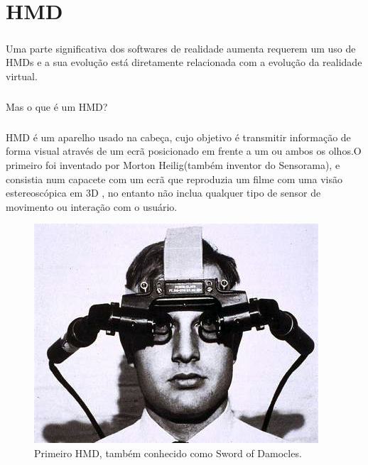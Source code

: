 \chapter{HMD}
		\paragraph{} 
Uma parte significativa dos softwares de realidade aumenta requerem um uso de HMDs e a sua evolução está diretamente relacionada com a evolução da realidade virtual.\paragraph{}
 Mas o que é um HMD? \paragraph*{}
 HMD é um aparelho usado na cabeça, cujo objetivo é transmitir informação de forma visual através de um ecrã posicionado em frente a um ou ambos os olhos.O primeiro foi inventado por Morton Heilig(também inventor do Sensorama), e consistia num capacete com um ecrã que reproduzia um filme com uma visão estereoscópica em 3D , no entanto não inclua qualquer tipo de sensor de movimento ou interação com o usuário. 
 \begin{figure}
 \center
 \includegraphics[scale=0.5]{imagens/HMD.jpg}
 \caption{Primeiro HMD, também conhecido como Sword of Damocles. \cite{3}}
 \end{figure}
\thispagestyle{empty}





